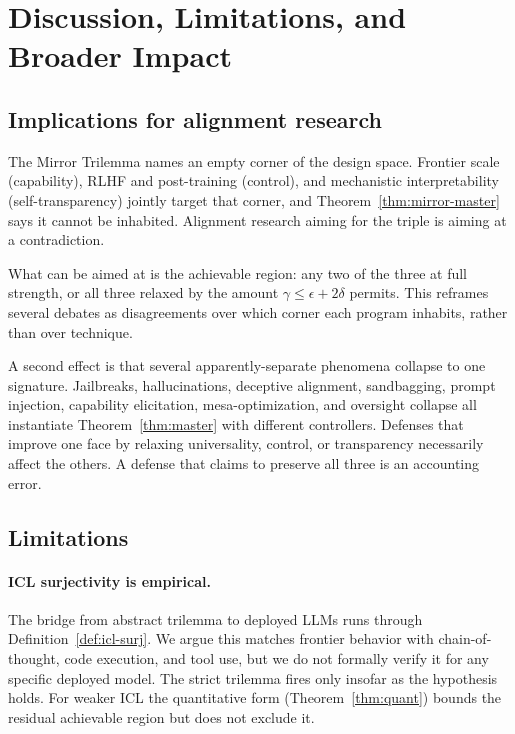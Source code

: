 \section{Discussion, Limitations, and Broader Impact}
\label{sec:discussion}

\subsection{Implications for alignment research}
\label{sec:alignment-implications}

The Mirror Trilemma names an empty corner of the design space. Frontier scale (capability), RLHF and post-training (control), and mechanistic interpretability (self-transparency) jointly target that corner, and Theorem~\ref{thm:mirror-master} says it cannot be inhabited. Alignment research aiming for the triple is aiming at a contradiction.

What can be aimed at is the achievable region: any two of the three at full strength, or all three relaxed by the amount $\gamma \le \epsilon + 2\delta$ permits. This reframes several debates as disagreements over which corner each program inhabits, rather than over technique.

A second effect is that several apparently-separate phenomena collapse to one signature. Jailbreaks, hallucinations, deceptive alignment, sandbagging, prompt injection, capability elicitation, mesa-optimization, and oversight collapse all instantiate Theorem~\ref{thm:master} with different controllers. Defenses that improve one face by relaxing universality, control, or transparency necessarily affect the others. A defense that claims to preserve all three is an accounting error.

\subsection{Limitations}
\label{sec:limitations}

\paragraph{ICL surjectivity is empirical.}
The bridge from abstract trilemma to deployed LLMs runs through Definition~\ref{def:icl-surj}. We argue this matches frontier behavior with chain-of-thought, code execution, and tool use, but we do not formally verify it for any specific deployed model. The strict trilemma fires only insofar as the hypothesis holds. For weaker ICL the quantitative form (Theorem~\ref{thm:quant}) bounds the residual achievable region but does not exclude it.

